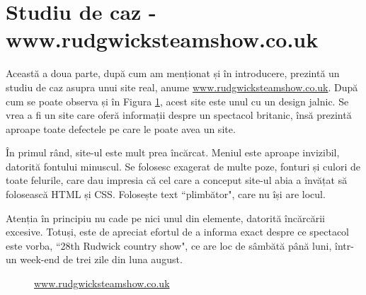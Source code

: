 \documentclass[12pt]{article} %
\begin{document}

\section{Studiu de caz - www.rudgwicksteamshow.co.uk} %

Această a doua parte, după cum am menționat și în introducere, prezintă un studiu de caz
asupra unui site real, anume \url{www.rudgwicksteamshow.co.uk}. După cum se poate observa
și în Figura \ref{fig:bad-site}, acest site este unul cu un design jalnic. Se vrea a fi
un site care oferă informații despre un spectacol britanic, însă prezintă aproape toate
defectele pe care le poate avea un site.

În primul rând, site-ul este mult prea încărcat. Meniul este aproape invizibil, datorită
fontului minuscul. Se folosesc exagerat de multe poze, fonturi și culori de toate
felurile, care dau impresia că cel care a conceput site-ul abia a învățat să folosească
HTML și CSS. Folosește text ``plimbător", care nu își are locul.

Atenția în principiu nu cade pe nici unul din elemente, datorită încărcării excesive.
Totuși, este de apreciat efortul de a informa exact despre ce spectacol este vorba,
``28th Rudwick country show", ce are loc de sâmbătă până luni, într-un week-end de trei
zile din luna august.

\begin{figure}[H] %
\caption{\url{www.rudgwicksteamshow.co.uk}}
\label{fig:bad-site}
\end{figure}
\end{document}
